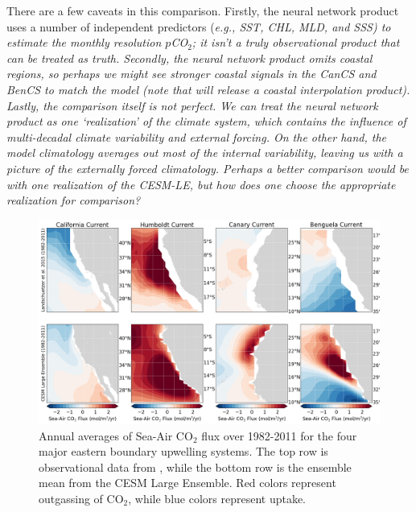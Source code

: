 \documentclass[12pt]{article}
\begin{document}
There are a few caveats in this comparison. Firstly, the neural network product uses a number of independent predictors (\it e.g.\rm, SST, CHL, MLD, and SSS) to estimate the monthly resolution $p$CO$_{2}$; it isn't a truly observational product that can be treated as truth. Secondly, the neural network product omits coastal regions, so perhaps we might see stronger coastal signals in the CanCS and BenCS to match the model (note that \citet{Laruelle2017} will release a coastal interpolation product). Lastly, the comparison itself is not perfect. We can treat the neural network product as one `realization' of the climate system, which contains the influence of multi-decadal climate variability and external forcing. On the other hand, the model climatology averages out most of the internal variability, leaving us with a picture of the externally forced climatology. Perhaps a better comparison would be with one realization of the CESM-LE, but how does one choose the appropriate realization for comparison?
\newpage
\begin{figure}[!h]
	\centering
	\includegraphics[width=\linewidth]{../../figs/all-systems/model_evaluation/landschuetzer-model-climatological-comparison.png}
	\caption{Annual averages of Sea-Air CO$_{2}$ flux over 1982-2011 for the four major eastern boundary upwelling systems. The top row is observational data from \citet{Landschutzer2013}, while the bottom row is the ensemble mean from the CESM Large Ensemble. Red colors represent outgassing of CO$_{2}$, while blue colors represent uptake.}
	\label{fig:evaluation}
\end{figure}
\end{document}
